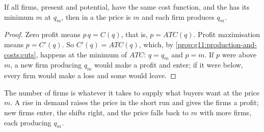 \begin{proposition}\label{prop:g11:perfect-competition:long-run}
If all firms, present and potential, have the same cost function, and the  has its minimum $m$ at $q_m$, then in a  the price is $m$ and each firm produces $q_m$.
\end{proposition}
\begin{proof}
Zero profit means $p\,q = C(q)$, that is, $p = \mathit{ATC}(q)$. Profit maximisation means $p = C'(q)$. So $C'(q) = \mathit{ATC}(q)$, which, by
\cref{prop:g11:production-and-costs:cuts}, happens at the minimum of $\mathit{ATC}$: $q = q_m$ and $p = m$. If $p$ were above $m$, a new firm producing $q_m$ would
make a profit and enter; if it were below, every firm would make a loss and some would leave.
\end{proof}

The number of firms is whatever it takes to supply what buyers want at the price $m$. A rise in demand raises the price in the short run and gives the firms a
profit; new firms enter, the  shifts right, and the price falls back to $m$ with more firms, each producing $q_m$.


